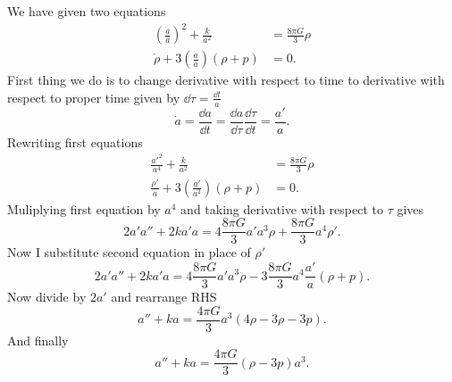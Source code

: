 We have given two equations
%
\begin{subequations}
    \begin{align}
        \left(\frac{\dot{a}}{a}\right)^2 + \frac{k}{a^2}         & = \frac{8\pi G}{3} \rho \\
        \dot{\rho} + 3 \left(\frac{\dot{a}}{a}\right) (\rho + p) & = 0.
    \end{align}
\end{subequations}
%
First thing we do is to change derivative with respect to time to derivative
with respect to proper time given by $\dd \tau = \frac{\dd t}{a}$
%
\begin{equation}
    \dot{a} = \frac{\dd a}{\dd t} =
    \frac{\dd a}{\dd \tau} \frac{\dd \tau}{\dd t} =
    \frac{a'}{a}.
\end{equation}
%
Rewriting first equations
%
\begin{subequations}
    \begin{align}
        \frac{a'^{2}}{a^4} + \frac{k}{a^2}                         & = \frac{8\pi G}{3} \rho
        \label{eq:ass9_fried}                                                                \\
        \frac{\rho'}{a} + 3 \left(\frac{a'}{a^2}\right) (\rho + p) & = 0.
        \label{eq:ass9_rho}
    \end{align}
\end{subequations}
%
Muliplying first equation by $a^4$ and taking derivative with respect to $\tau$
gives
%
\begin{equation}
    2 a' a'' + 2k a' a =
    4\frac{8\pi G}{3} a' a^3 \rho + \frac{8\pi G}{3} a^4 \rho'.
\end{equation}
%
Now I substitute second equation in place of $\rho'$
%
\begin{equation}
    2 a' a'' + 2k a' a =
    4\frac{8\pi G}{3} a' a^3 \rho - 3\frac{8\pi G}{3} a^4 \frac{a'}{a} (\rho + p).
\end{equation}
%
Now divide by $2a'$ and rearrange RHS
%
\begin{equation}
    a'' + k a =
    \frac{4\pi G}{3} a^3 \left(4 \rho - 3 \rho - 3p \right).
\end{equation}
%
And finally
%
\begin{equation}
    \boxed{a'' + k a =
        \frac{4\pi G}{3} \left(\rho - 3p \right) a^3.}
    \label{eq:ass9_sol}
\end{equation}

\subproblem

